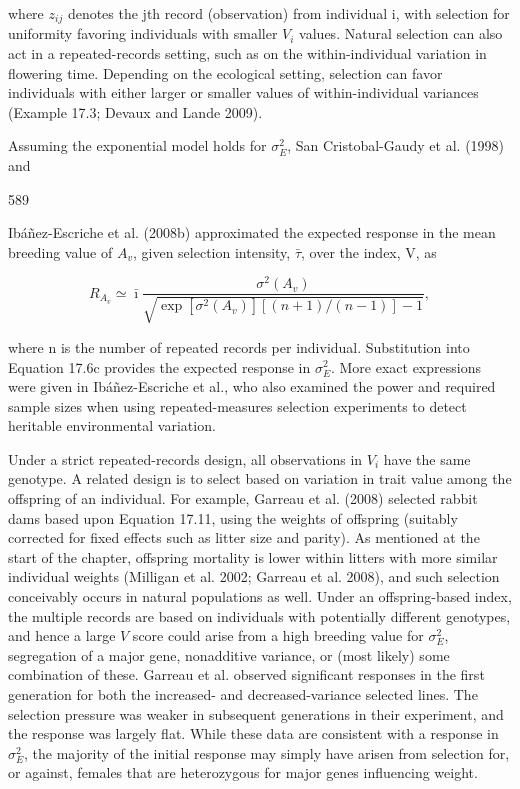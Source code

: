 \documentclass{article}
\begin{document}
where  $ z_{ij} $ denotes the jth record (observation) from individual i, with selection for uniformity favoring individuals with smaller  $ V_i $ values. Natural selection can also act in a repeated-records setting, such as on the within-individual variation in flowering time. Depending on the ecological setting, selection can favor individuals with either larger or smaller values of within-individual variances (Example 17.3; Devaux and Lande 2009).

Assuming the exponential model holds for  $ \sigma_{E}^{2} $, San Cristobal-Gaudy et al. (1998) and

589

Ibáñez-Escriche et al. (2008b) approximated the expected response in the mean breeding value of  $ A_{v} $, given selection intensity,  $ \bar{\tau} $, over the index, V, as

\begin{equation}
R_{A_{v}}\simeq\bar{\imath}\frac{\sigma^{2}(A_{v})}{\sqrt{\exp\left[\sigma^{2}(A_{v})\right]\left[(n+1)/(n-1)\right]-1}},
\tag{17.12}
\label{eq:17_12}
\end{equation}

where n is the number of repeated records per individual. Substitution into Equation 17.6c provides the expected response in  $ \sigma_{E}^{2} $. More exact expressions were given in Ibáñez-Escriche et al., who also examined the power and required sample sizes when using repeated-measures selection experiments to detect heritable environmental variation.

Under a strict repeated-records design, all observations in  $ V_i $ have the same genotype. A related design is to select based on variation in trait value among the offspring of an individual. For example, Garreau et al. (2008) selected rabbit dams based upon Equation 17.11, using the weights of offspring (suitably corrected for fixed effects such as litter size and parity). As mentioned at the start of the chapter, offspring mortality is lower within litters with more similar individual weights (Milligan et al. 2002; Garreau et al. 2008), and such selection conceivably occurs in natural populations as well. Under an offspring-based index, the multiple records are based on individuals with potentially different genotypes, and hence a large  $ V $ score could arise from a high breeding value for  $ \sigma_E^2 $, segregation of a major gene, nonadditive variance, or (most likely) some combination of these. Garreau et al. observed significant responses in the first generation for both the increased- and decreased-variance selected lines. The selection pressure was weaker in subsequent generations in their experiment, and the response was largely flat. While these data are consistent with a response in  $ \sigma_E^2 $, the majority of the initial response may simply have arisen from selection for, or against, females that are heterozygous for major genes influencing weight.
\end{document}
